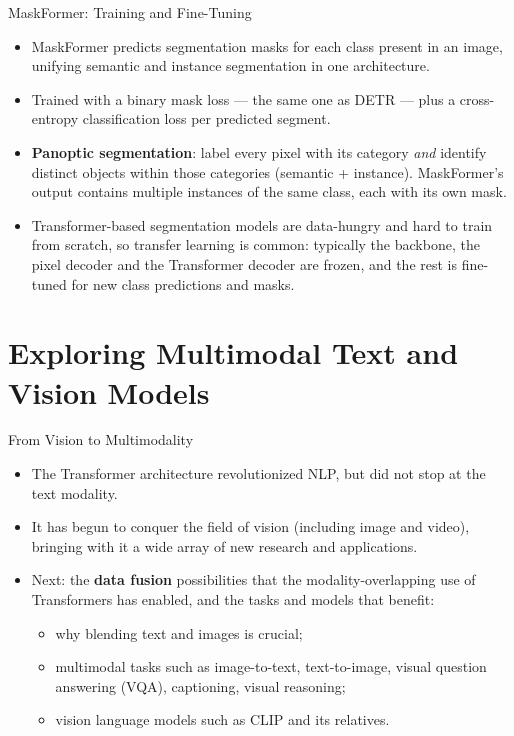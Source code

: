\begin{frame}{MaskFormer: Training and Fine-Tuning}
\small%
\begin{itemize}
  \item MaskFormer predicts segmentation masks for each class present in an image, unifying semantic and instance segmentation in one architecture.
  \item Trained with a binary mask loss --- the same one as DETR --- plus a cross-entropy classification loss per predicted segment.
  \item \textbf{Panoptic segmentation}: label every pixel with its category \textit{and} identify distinct objects within those categories (semantic + instance). MaskFormer's output contains multiple instances of the same class, each with its own mask.
  \item Transformer-based segmentation models are data-hungry and hard to train from scratch, so transfer learning is common: typically the backbone, the pixel decoder and the Transformer decoder are frozen, and the rest is fine-tuned for new class predictions and masks.
\end{itemize}
\end{frame}

\section{Exploring Multimodal Text and Vision Models}

\begin{frame}{From Vision to Multimodality}
\begin{itemize}
  \item The Transformer architecture revolutionized NLP, but did not stop at the text modality.
  \item It has begun to conquer the field of vision (including image and video), bringing with it a wide array of new research and applications.
  \item Next: the \textbf{data fusion} possibilities that the modality-overlapping use of Transformers has enabled, and the tasks and models that benefit:
  \begin{itemize}
    \item why blending text and images is crucial;
    \item multimodal tasks such as image-to-text, text-to-image, visual question answering (VQA), captioning, visual reasoning;
    \item vision language models such as CLIP and its relatives.
  \end{itemize}
\end{itemize}
\end{frame}

